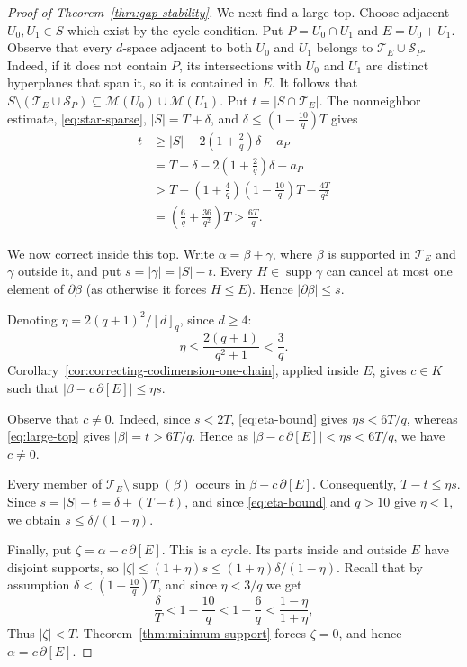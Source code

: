 \documentclass[11pt]{article}
\numberwithin{equation}{section}
\newcommand{\supp}{\operatorname{supp}}
\begin{document}
\begin{proof}[Proof of Theorem~\ref{thm:gap-stability}]
We next find a large top. Choose adjacent $U_0,U_1\in S$ which exist by the cycle condition. Put $P=U_0\cap U_1$ and $E=U_0+U_1$.
Observe that every $d$-space adjacent to both $U_0$ and $U_1$ belongs to
$\mathcal T_E\cup\mathcal S_P$. Indeed, if it does not contain $P$,
its intersections with $U_0$ and $U_1$ are distinct hyperplanes that
span it, so it is contained in $E$. It follows that
$S\setminus(\mathcal T_E\cup\mathcal S_P)
\subseteq\mathcal M(U_0)\cup\mathcal M(U_1)$.
Put $t=|S\cap\mathcal T_E|$. The nonneighbor estimate,
\eqref{eq:star-sparse}, $|S|=T+\delta$, and $\delta \leq (1-\frac{10}{q})T$ gives
\begin{equation}\label{eq:large-top}
\begin{aligned}
t
&\ge |S|-2\left(1+\frac2q\right)\delta-a_P\\
&= T+\delta-2\left(1+\frac2q\right)\delta-a_P\\
&>T-\left(1+\frac4q\right)
       \left(1-\frac{10}{q}\right)T-\frac{4T}{q^2}\\
&=\left(\frac6q+\frac{36}{q^2}\right)T
>\frac{6T}{q}.
\end{aligned}
\end{equation}

We now correct inside this top. Write $\alpha=\beta+\gamma$, where
$\beta$ is supported in $\mathcal T_E$ and $\gamma$ outside it, and
put $s=|\gamma|=|S|-t$.
Every $H \in \supp \gamma$ can cancel at most one element of $\partial \beta$ (as otherwise it forces $H \leq E$). Hence
$|\partial\beta|\le s$.

Denoting $\eta=2(q+1)^2/[d]_q$,
since $d\ge4$:
\begin{equation}\label{eq:eta-bound}
\eta
\le\frac{2(q+1)}{q^2+1}
<\frac3q.
\end{equation}
Corollary~\ref{cor:correcting-codimension-one-chain}, applied inside
$E$, gives $c\in K$ such that
$|\beta-c\,\partial[E]|\le\eta s$.

Observe that $c\ne0$. Indeed, since $s<2T$, \eqref{eq:eta-bound} gives
$\eta s<6T/q$, whereas \eqref{eq:large-top} gives $|\beta|=t>6T/q$. Hence as $|\beta-c\,\partial[E]|<\eta s<6T/q$, we have $c\ne0$.

Every member of $\mathcal T_E\setminus\supp(\beta)$ occurs in
$\beta-c\,\partial[E]$. Consequently, $T-t\le\eta s$.
Since $s=|S|-t=\delta+(T-t)$, and since \eqref{eq:eta-bound} and $q>10$ give
$\eta<1$, we obtain $s\le\delta/(1-\eta)$.

Finally, put $\zeta=\alpha-c\,\partial[E]$. This is a cycle. Its parts
inside and outside $E$ have disjoint supports, so
$|\zeta|\le(1+\eta)s\le(1+\eta)\delta/(1-\eta)$.
Recall that by assumption $\delta < (1-\frac{10}{q})T$, and since $\eta < 3/q$ we get
\[
\frac{\delta}{T}
<1-\frac{10}{q}
<1-\frac6q
<\frac{1-\eta}{1+\eta},
\]
Thus $|\zeta|<T$. Theorem~\ref{thm:minimum-support} forces $\zeta=0$, and
hence $\alpha=c\,\partial[E]$.
\end{proof}
\end{document}

